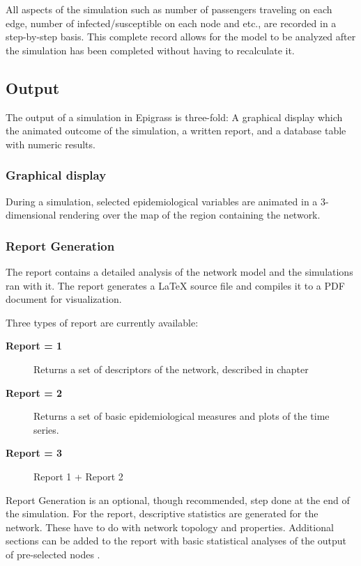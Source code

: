 \documentclass[a4paper,10pt]{manual}
\begin{document}
All aspects of the simulation such as number of passengers traveling on each edge, number of infected/susceptible on each node and etc., are recorded in a step-by-step basis. This complete record allows for the model to be analyzed after the simulation has been completed without having to recalculate it.


\subsection{Output}

The output of a simulation in Epigrass is three-fold: A graphical display which the animated outcome of the simulation,  a written report, and a database table with numeric results.


\subsubsection{Graphical display}

During a simulation, selected epidemiological variables are animated in a 3-dimensional rendering over the map of the region containing the network.


\subsubsection{Report Generation}

The report contains a detailed analysis of the network model and the simulations ran with it. The report generates a LaTeX source file and compiles it to a PDF document for visualization.

Three types of report are currently available:
\begin{description}
\item[\textbf{Report = 1}]
Returns a set of descriptors of the network, described in chapter

\item[\textbf{Report = 2}]
Returns a set of basic epidemiological measures and plots of the time series.

\item[\textbf{Report = 3}]
Report 1 + Report 2

\end{description}

Report Generation is an optional, though recommended, step done at the end of the simulation. For the report, descriptive statistics are generated for the network. These have to do with network topology and properties. Additional sections can be added to the report with basic statistical analyses of the output of pre-selected nodes \footnotemark[2] .
\end{document}

